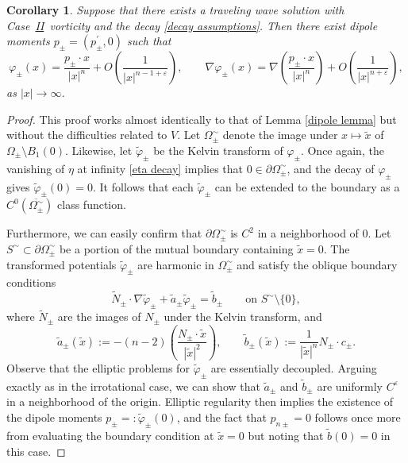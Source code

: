 \documentclass[11pt,reqno]{amsart}
\newcommand{\VS}{\texorpdfstring{\hyperref[sec sheets]{II}}{II}}
\theoremstyle{plain}
\newtheorem{corollary}[theorem]{Corollary}
\theoremstyle{remark}
\numberwithin{equation}{section}
\begin{document}
\begin{corollary} \label{vortex sheet dipole}
Suppose that there exists a traveling wave solution with Case~\VS~vorticity and the decay \eqref{decay assumptions}.  Then there exist dipole moments $p_\pm = (p_\pm^\prime, 0)$ such that 
\begin{equation}
  \varphi_\pm(x) = \frac{p_\pm \cdot x}{|x|^n} + O\left(\frac{1}{|x|^{n-1+\varepsilon}} \right), \qquad \nabla \varphi_\pm(x) = \nabla \left( \frac{p_\pm \cdot x}{|x|^n} \right) + O\left(\frac{1}{|x|^{n+\varepsilon}} \right), \label{phi asymptotic sheet} 
\end{equation}
as $|x| \to \infty$.  
\end{corollary}
\begin{proof}  This proof works almost identically to that of Lemma \ref{dipole lemma} but without the difficulties related to $V$.  Let $\Omega_\pm^\sim$ denote the image under $x \mapsto \tilde x$
  of $\Omega_\pm \setminus B_1(0)$.  Likewise, let $\tilde \varphi_\pm$ be the Kelvin transform of $\varphi_\pm$.  
 Once again, the vanishing of $\eta$ at infinity \eqref{eta decay} implies that $0 \in \partial \Omega_\pm^\sim$, and the decay of $\varphi_\pm$ gives $\tilde\varphi_\pm (0) = 0$.  It follows that each $\tilde \varphi_\pm$ can be extended to the boundary as a $C^0(\overline{\Omega_\pm^\sim})$ class function.

Furthermore, we can easily confirm that $\partial \Omega_\pm^\sim$ is $C^2$ in a neighborhood of $0$.  Let $S^\sim \subset \partial \Omega_\pm^\sim$ be a portion of the mutual boundary containing $\tilde x =0$.  The transformed potentials $\tilde\varphi_\pm$ are harmonic in $\Omega_\pm^\sim$ and satisfy the oblique boundary conditions 
\[ \tilde N_\pm \cdot \nabla \tilde \varphi_\pm + \tilde a_\pm \tilde \varphi_\pm = \tilde b_\pm \qquad \textrm{on } S^\sim \setminus \{0\},\]
where $\tilde N_\pm$ are the images of $N_\pm$ under the Kelvin transform, and 
\[ \tilde a_\pm(\tilde x) := -(n-2) \left(\frac{N_\pm \cdot \tilde x}{|\tilde x|^2} \right), \qquad \tilde b_\pm(\tilde x) := \frac{1}{|\tilde x|^n} N_\pm \cdot c_\pm.\]
Observe that the elliptic problems for $\tilde \varphi_\pm$ are essentially decoupled.  Arguing exactly as in the irrotational case, we can show that $\tilde a_\pm $ and $\tilde b_\pm$ are uniformly $C^\varepsilon$ in a neighborhood of the origin.  Elliptic regularity then implies the existence of the dipole moments $p_\pm =: \tilde \varphi_\pm(0)$, and the fact that $p_{n\pm} = 0$ follows once more from evaluating the boundary condition at $\tilde x =0$ but noting that $\tilde b(0) = 0$ in this case.  
\end{proof}
\end{document}
